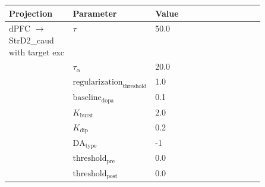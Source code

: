 \documentclass{article}
\begin{document}
\noindent
\begin{tabularx}{\linewidth}{|p{0.25\linewidth}|p{0.25\linewidth}|X|}\hline
\textbf{Projection} & \textbf{Parameter} & \textbf{Value}   \\ \hline

    dPFC  $\rightarrow$ StrD2\_caud with target exc & $\tau$        & 50.0  \\ \hline

     & $\tau_\alpha$        & 20.0  \\ \hline

     & ${\text{regularization}}_{\text{threshold}}$        & 1.0  \\ \hline

     & ${\text{baseline}}_{\text{dopa}}$        & 0.1  \\ \hline

     & $K_{\text{burst}}$        & 2.0  \\ \hline

     & $K_{\text{dip}}$        & 0.2  \\ \hline

     & ${\text{DA}}_{\text{type}}$        & -1  \\ \hline

     & ${\text{threshold}}_{\text{pre}}$        & 0.0  \\ \hline

     & ${\text{threshold}}_{\text{post}}$        & 0.0  \\ \hline

\end{tabularx}

\vspace{2ex}
\end{document}

